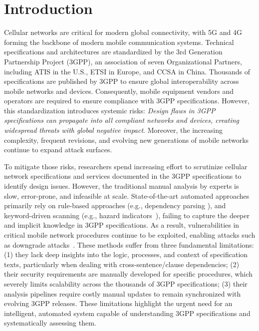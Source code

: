 \section{Introduction}

\noindent Cellular networks are critical for modern global connectivity, with 5G and 4G forming the backbone of modern mobile communication systems. Technical specifications and architectures are standardized by the 3rd Generation Partnership Project (3GPP), an association of seven Organizational Partners, including ATIS in the U.S., ETSI in Europe, and CCSA in China. Thousands of specifications are published by 3GPP to ensure global interoperability across mobile networks and devices.
Consequently, mobile equipment vendors and operators are required to ensure compliance with 3GPP specifications. However, this standardization introduces systemic risks: 
\textit{Design flaws in 3GPP specifications can propagate into all compliant networks and devices, creating widespread threats with global negative impact}. 
Moreover, the increasing complexity, frequent revisions, and evolving new generations of mobile networks continue to expand attack surfaces. 

To mitigate those risks, researchers spend increasing effort to scrutinize cellular network specifications and services documented in the 3GPP specifications to identify design issues. However, the traditional manual analysis by experts is slow, error-prone, and infeasible at scale. 
State-of-the-art automated approaches primarily rely on rule-based approaches (e.g., dependency parsing \cite{chen2021bookworm,al2024hermes}), and keyword-driven scanning (e.g., hazard indicators~\cite{chen2021bookworm}), failing to capture the deeper and implicit knowledge in 3GPP specifications.  
As a result, vulnerabilities in critical mobile network procedures continue to be exploited, enabling attacks such as downgrade attacks~\cite{shaik2015practical, chen2021bookworm, 6550445, kambourakis2011attacks,
      lee2009detection, leong2014unveiling, hussain20195greasoner,
      hussain2018lteinspector, kim2019touching, 8894379}. 
These methods suffer from three fundamental limitations: (1) they lack deep insights into the logic, processes, and context of specification texts, particularly when dealing with cross-sentence/clause dependencies; (2) their security requirements are manually developed for specific procedures, which severely limits scalability across the thousands of 3GPP specifications; (3) their analysis pipelines require costly manual updates to remain synchronized with evolving 3GPP releases.  
These limitations highlight the urgent need for an intelligent, automated system capable of understanding 3GPP specifications and systematically assessing them.  

